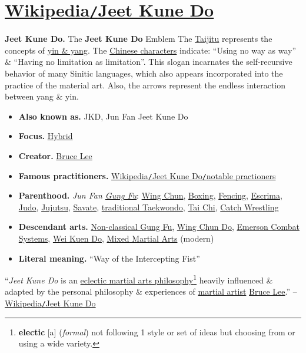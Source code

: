 \documentclass[oneside]{book}
\numberwithin{equation}{section}
\begin{document}
\section{\href{https://en.wikipedia.org/wiki/Jeet_Kune_Do}{Wikipedia\texttt{/}Jeet Kune Do}}
\textbf{Jeet Kune Do.} The \textbf{Jeet Kune Do} Emblem The \href{https://en.wikipedia.org/wiki/Taijitu}{Taijitu} represents the concepts of \href{https://en.wikipedia.org/wiki/Yin_and_yang}{yin \& yang}. The \href{https://en.wikipedia.org/wiki/Chinese_character}{Chinese characters} indicate: ``Using no way as way'' \& ``Having no limitation as limitation''. This slogan incarnates the self-recursive behavior of many Sinitic languages, which also appears incorporated into the practice of the material art. Also, the arrows represent the endless interaction between yang \& yin.
\begin{itemize}
	\item \textbf{Also known as.} JKD, Jun Fan Jeet Kune Do
	\item \textbf{Focus.} \href{https://en.wikipedia.org/wiki/Hybrid_martial_arts}{Hybrid}
	\item \textbf{Creator.} \href{https://en.wikipedia.org/wiki/Bruce_Lee}{Bruce Lee}
	\item \textbf{Famous practitioners.} \href{https://en.wikipedia.org/wiki/Jeet_Kune_Do#Notable_practitioners}{Wikipedia\texttt{/}Jeet Kune Do\texttt{/}notable practioners}
	\item \textbf{Parenthood.} \textit{Jun Fan \href{https://en.wikipedia.org/wiki/Gung_Fu}{Gung Fu}}: \href{https://en.wikipedia.org/wiki/Wing_Chun}{Wing Chun}, \href{https://en.wikipedia.org/wiki/Boxing}{Boxing}, \href{https://en.wikipedia.org/wiki/Fencing}{Fencing}, \href{https://en.wikipedia.org/wiki/Escrima}{Escrima}, \href{https://en.wikipedia.org/wiki/Judo}{Judo}, \href{https://en.wikipedia.org/wiki/Jujutsu}{Jujutsu}, \href{https://en.wikipedia.org/wiki/Savate}{Savate}, \href{https://en.wikipedia.org/wiki/Taekwondo#1946:_Traditional_Taekwondo}{traditional Taekwondo}, \href{https://en.wikipedia.org/wiki/Tai_Chi}{Tai Chi}, \href{https://en.wikipedia.org/wiki/Catch_Wrestling}{Catch Wrestling}
	\item \textbf{Descendant arts.} \href{https://en.wikipedia.org/wiki/Jesse_Glover}{Non-classical Gung Fu}, \href{https://en.wikipedia.org/wiki/James_W._DeMile}{Wing Chun Do}, \href{https://en.wikipedia.org/wiki/Emerson_Combat_Systems}{Emerson Combat Systems}, \href{https://en.wikipedia.org/wiki/Leo_Fong}{Wei Kuen Do}, \href{https://en.wikipedia.org/wiki/Mixed_Martial_Arts}{Mixed Martial Arts} (modern)
	\item \textbf{Literal meaning.} ``Way of the Intercepting Fist''
\end{itemize}
``\textit{Jeet Kune Do} is an \href{https://en.wikipedia.org/wiki/Hybrid_martial_art}{eclectic martial arts philosophy}\footnote{\textbf{electic} [a] (\textit{formal}) not following 1 style or set of ideas but choosing from or using a wide variety.} heavily influenced \& adapted by the personal philosophy \& experiences of \href{https://en.wikipedia.org/wiki/Martial_artist}{martial artist} \href{https://en.wikipedia.org/wiki/Bruce_Lee}{Bruce Lee}.'' -- \href{https://en.wikipedia.org/wiki/Jeet_Kune_Do}{Wikipedia\texttt{/}Jeet Kune Do}
\end{document}
